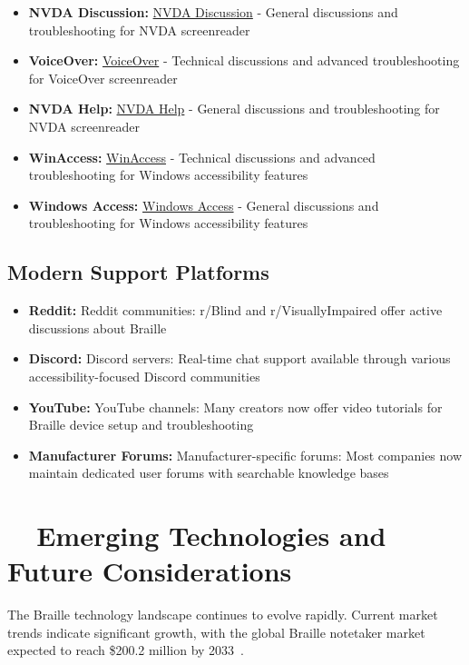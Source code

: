 \begin{itemize}
	\item \textbf{NVDA Discussion:} \href{https://groups.io/g/NVDAdiscussion/messages}{NVDA Discussion} - General discussions and troubleshooting for NVDA screenreader
	\item \textbf{VoiceOver:} \href{https://groups.io/g/voiceover/messages}{VoiceOver} - Technical discussions and advanced troubleshooting for VoiceOver screenreader
	\item \textbf{NVDA Help:} \href{https://groups.io/g/NVDAhelp/messages}{NVDA Help} - General discussions and troubleshooting for NVDA screenreader
	\item \textbf{WinAccess:} \href{https://winaccess.groups.io/g/winaccess/messages}{WinAccess} - Technical discussions and advanced troubleshooting for Windows accessibility features
	\item \textbf{Windows Access:} \href{https://groups.io/g/windows-access/messages}{Windows Access} - General discussions and troubleshooting for Windows accessibility features
\end{itemize}

\subsection{Modern Support Platforms}
\label{app2:modern-support}
\begin{itemize}
	\item \textbf{Reddit:} Reddit communities: r/Blind and r/VisuallyImpaired offer active discussions about Braille 
	\item \textbf{Discord:} Discord servers: Real-time chat support available through various accessibility-focused Discord communities
	\item \textbf{YouTube:} YouTube channels: Many creators now offer video tutorials for Braille device setup and troubleshooting
	\item \textbf{Manufacturer Forums:} Manufacturer-specific forums: Most companies now maintain dedicated user forums with searchable knowledge bases
\end{itemize}

\section{~~Emerging Technologies and Future Considerations}
\label{app2:emerging}
The Braille technology landscape continues to evolve rapidly. Current market trends indicate significant growth, with the global Braille notetaker market expected to reach \$200.2 million by 2033~\supercite{BrailleMarketResearch}.

